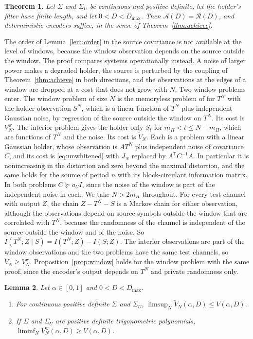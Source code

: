 \documentclass[11pt,onecolumn]{IEEEtran}
\newtheorem{theorem}{Theorem}
\newtheorem{lemma}[theorem]{Lemma}
\begin{document}
\begin{theorem}\label{thm:filter}
Let $\Sigma$ and $\Sigma_U$ be continuous and positive definite, let
the holder's filter have finite length, and let $0<D<D_{\max}$. Then
$\mathcal A(D)=\mathcal R(D)$, and deterministic encoders suffice, in
the sense of Theorem~\ref{thm:achieve}.
\end{theorem}

The order of Lemma~\ref{lem:order} in the source covariance is not
available at the level of windows, because the window observation
depends on the source outside the window. The proof compares systems
operationally instead. A noise of larger power makes a degraded
holder, the source is perturbed by the coupling of
Theorem~\ref{thm:achieve} in both directions, and the observations at
the edges of a window are dropped at a cost that does not grow with
$N$. Two window problems enter. The window problem of size $N$ is the
memoryless problem of \cite{part1} for $T^N$ with the holder observation
$S^N$, which is a linear function of $T^N$ plus independent Gaussian
noise, by regression of the source outside the window on $T^N$. Its
cost is $V^{\mathrm w}_N$. The interior problem gives the holder only
$S_t$ for $m_H<t\le N-m_H$, which are functions of $T^N$ and the noise.
Its cost is $\tilde V_N$. Each is a problem with a linear Gaussian
holder, whose observation is $AT^N$ plus independent noise of covariance
$C$, and its cost is \eqref{eq:unwhitened} with $J_N$ replaced by
$A^{\mathsf T}C^{-1}A$. In particular it is nonincreasing in the
distortion and zero beyond the maximal distortion, and the same holds
for the source of period $n$ with its block-circulant information
matrix. In both problems $C\succeq a_UI$, since the noise of the
window is part of the independent noise in each. We take $N>2m_H$
throughout. For every test channel with output $Z$, the chain
$Z-T^N-S$ is a Markov chain for either observation, although the
observations depend on source symbols outside the window that are
correlated with $T^N$, because the randomness of the channel is
independent of the source outside the window and of the noise. So
$I(T^N;Z\mid S)=I(T^N;Z)-I(S;Z)$. The interior observations are part of
the window observations and the two problems have the same test
channels, so $\tilde V_N\ge V^{\mathrm w}_N$. Proposition~\ref{prop:window} holds for
the window problem with the same proof, since the encoder's output
depends on $T^N$ and private randomness only.

\begin{lemma}\label{lem:filterwindows}
Let $\alpha\in[0,1]$ and $0<D<D_{\max}$.
\begin{enumerate}
\item[(a)] For continuous positive definite $\Sigma$ and $\Sigma_U$,
$\limsup_N\tilde V_N(\alpha,D)\le V(\alpha,D)$.
\item[(b)] If $\Sigma$ and $\Sigma_U$ are positive definite
trigonometric polynomials,
$\liminf_NV^{\mathrm w}_N(\alpha,D)\ge V(\alpha,D)$.
\end{enumerate}
\end{lemma}
\end{document}
